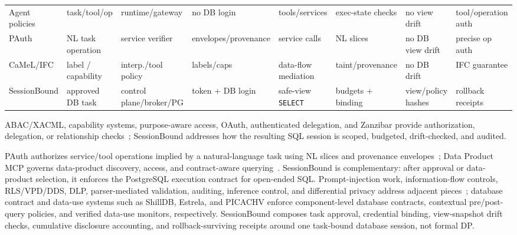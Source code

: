 \documentclass[journal]{IEEEtran}
\newcounter{algorithm}
\begin{document}
\begin{table}[!t]
{\begin{tabular}{@{}llllllll@{}}
Agent policies~\cite{shi2025progent,wang2025agentspec,jia2025taskshield} &
task/tool/op &
runtime/gateway &
no DB login &
tools/services &
exec-state checks &
no view drift &
tool/operation auth \\
PAuth~\cite{sharma2026pauth} &
NL task operation &
service verifier &
envelopes/provenance &
service calls &
NL slices &
no DB view drift &
precise op auth \\
CaMeL/IFC~\cite{debenedetti2025camel,costa2025ifcagents} &
label / capability &
interp./tool policy &
labels/caps &
data-flow mediation &
taint/provenance &
no DB drift &
IFC guarantee \\
SessionBound &
approved DB task &
control plane/broker/PG &
token + DB login &
safe-view \texttt{SELECT} &
budgets + binding &
view/policy hashes &
rollback receipts \\
\bottomrule
\end{tabular}
}
\end{table}

ABAC/XACML, capability systems, purpose-aware access, OAuth,
authenticated delegation, and Zanzibar provide authorization,
delegation, or relationship checks~\cite{nist2019abac,oasis2013xacml,dennis1966programming,miller2003capability,agrawal2002hippocratic,byun2008purpose,rfc6749,south2025authenticateddelegation,pang2019zanzibar};
SessionBound addresses how the resulting SQL session is scoped,
budgeted, drift-checked, and audited.

PAuth authorizes service/tool operations implied by a natural-language
task using NL slices and provenance envelopes~\cite{sharma2026pauth};
Data Product MCP governs data-product discovery, access, and
contract-aware querying~\cite{tonnarelli2026dataproductmcp,mcp2025specification}.
SessionBound is complementary: after approval or data-product selection,
it enforces the PostgreSQL execution contract for open-ended SQL.
Prompt-injection work, information-flow controls, RLS/VPD/DDS, DLP,
parser-mediated validation, auditing, inference control, and
differential privacy address adjacent
pieces~\cite{greshake2023indirect,liu2023promptinjection,owasp2025llm01,myers1997difc,costa2025ifcagents,postgresql2026rowsecurity,oracle2026vpd,oracle2026deepdatasecuritydocs,oracle2026deepdatasecuritybrief,alneyadi2016dlps,nist2026dlpglossary,boyd2004sqlrand,su2006essence,kleinberg2000auditing,adam1989securitycontrol,dwork2014algorithmic};
database contract and data-use systems such as ShillDB, Estrela, and
PICACHV enforce component-level database contracts, contextual
pre/post-query policies, and verified data-use monitors, respectively.
SessionBound composes task approval, credential binding, view-snapshot
drift checks, cumulative disclosure accounting, and rollback-surviving
receipts around one task-bound database session, not formal DP.
\end{document}
